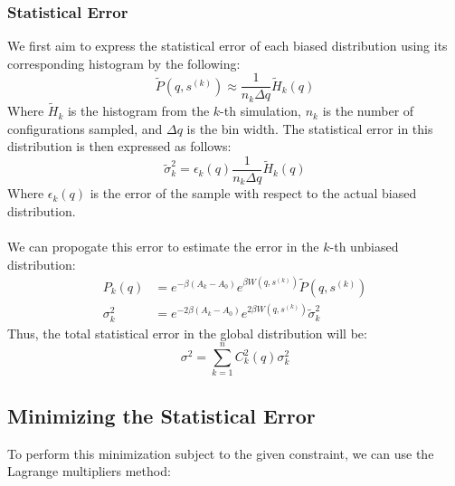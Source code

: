 \documentclass{article}
\begin{document}
\subsubsection{Statistical Error}
We first aim to express the statistical error of each biased distribution using its corresponding histogram by the following:
$$ \tilde{P}(q, s^{(k)}) \approx \frac{1}{n_k \Delta q} \tilde{H}_k(q) $$
Where $\tilde{H}_k$ is the histogram from the $k$-th simulation, $n_k$ is the number of configurations sampled, and $\Delta q$ is the bin width.
The statistical error in this distribution is then expressed as follows:
$$ \tilde{\sigma}_k^2 = \epsilon_k(q) \frac{1}{n_k \Delta q} \tilde{H}_k(q)$$
Where $\epsilon_k(q)$ is the error of the sample with respect to the actual biased distribution.
\\\\
We can propogate this error to estimate the error in the $k$-th unbiased distribution:
\begin{align*}
    P_k(q) &= e^{-\beta(A_k - A_0)} e^{\beta W\left(q, s^{(k)}\right)} \tilde{P}(q, s^{(k)})\\
    \sigma_k^2 &= e^{-2 \beta (A_k - A_0)}e^{2 \beta W(q, s^{(k)})}\tilde{\sigma}_k^2
\end{align*}
Thus, the total statistical error in the global distribution will be:
$$ \sigma^2 = \sum_{k=1}^n C_k^2(q) \sigma_k^2 $$

\subsection{Minimizing the Statistical Error}
To perform this minimization subject to the given constraint, we can use the Lagrange multipliers method:
\end{document}
